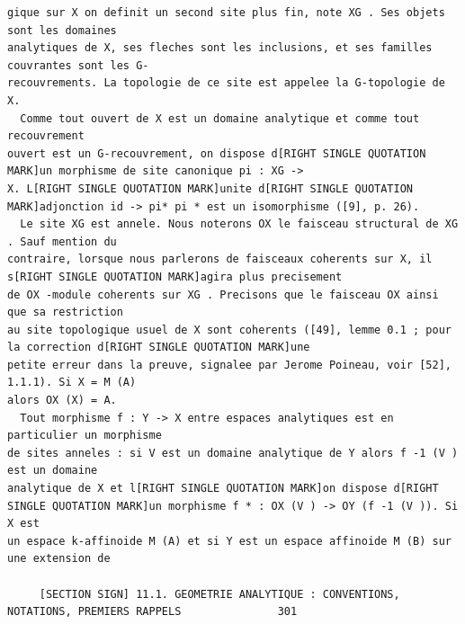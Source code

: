 \documentclass[
  11pt,
]{article}
\begin{document}
\begin{lstlisting}
gique sur X on definit un second site plus fin, note XG . Ses objets sont les domaines
analytiques de X, ses fleches sont les inclusions, et ses familles couvrantes sont les G-
recouvrements. La topologie de ce site est appelee la G-topologie de X.
  Comme tout ouvert de X est un domaine analytique et comme tout recouvrement
ouvert est un G-recouvrement, on dispose d[RIGHT SINGLE QUOTATION MARK]un morphisme de site canonique pi : XG ->
X. L[RIGHT SINGLE QUOTATION MARK]unite d[RIGHT SINGLE QUOTATION MARK]adjonction id -> pi* pi * est un isomorphisme ([9], p. 26).
  Le site XG est annele. Nous noterons OX le faisceau structural de XG . Sauf mention du
contraire, lorsque nous parlerons de faisceaux coherents sur X, il s[RIGHT SINGLE QUOTATION MARK]agira plus precisement
de OX -module coherents sur XG . Precisons que le faisceau OX ainsi que sa restriction
au site topologique usuel de X sont coherents ([49], lemme 0.1 ; pour la correction d[RIGHT SINGLE QUOTATION MARK]une
petite erreur dans la preuve, signalee par Jerome Poineau, voir [52], 1.1.1). Si X = M (A)
alors OX (X) = A.
  Tout morphisme f : Y -> X entre espaces analytiques est en particulier un morphisme
de sites anneles : si V est un domaine analytique de Y alors f -1 (V ) est un domaine
analytique de X et l[RIGHT SINGLE QUOTATION MARK]on dispose d[RIGHT SINGLE QUOTATION MARK]un morphisme f * : OX (V ) -> OY (f -1 (V )). Si X est
un espace k-affinoide M (A) et si Y est un espace affinoide M (B) sur une extension de

     [SECTION SIGN] 11.1. GEOMETRIE ANALYTIQUE : CONVENTIONS, NOTATIONS, PREMIERS RAPPELS               301


\end{lstlisting}
\end{document}
